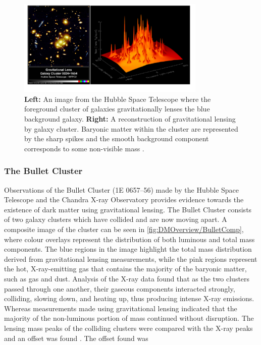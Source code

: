 \begin{figure}[ht!]
	\centering
	\includegraphics[width=0.8\textwidth]{figures/DMOverview/Strong_Grav_lens.png}
	\caption[\textbf{Left:} Effects of gravitational lensing on multiple galaxies. \textbf{Right:} Reconstruction of gravitational lensing effects.]{\textbf{Left:} An image from the Hubble Space Telescope where the foreground cluster of galaxies gravitationally lenses the blue background galaxy. \textbf{Right:} A reconstruction of gravitational lensing by galaxy cluster. Baryonic matter within the cluster are represented by the sharp spikes and the smooth background component corresponds to some non-visible mass \cite{Freese2009}.}
	\label{fig:DMOverview/StrongGravLens}
\end{figure}
\subsubsection{The Bullet Cluster}\label{sec:DMOverview/BulletCluster}
Observations of the Bullet Cluster (1E 0657–56) made by the Hubble Space Telescope and the Chandra X-ray Observatory provides evidence towards the existence of dark matter using gravitational lensing.
The Bullet Cluster consists of two galaxy clusters which have collided and are now moving apart. A composite image of the cluster can be seen in \autoref{fig:DMOverview/BulletComp}, where colour overlays represent the distribution of both luminous and total mass components. The blue regions in the image highlight the total mass distribution derived from gravitational lensing measurements, while the pink regions represent the hot, X-ray-emitting gas that contains the majority of the baryonic matter, such as gas and dust. Analysis of the X-ray data found that as the two clusters passed through one another, their gaseous components interacted strongly, colliding, slowing down, and heating up, thus producing intense X-ray emissions. Whereas measurements made using gravitational lensing indicated that the majority of the non-luminous portion of mass continued without disruption. The lensing mass peaks of the colliding clusters were compared with the X-ray peaks and an offset was found \cite{Clowe_2004}. The offset found was 

